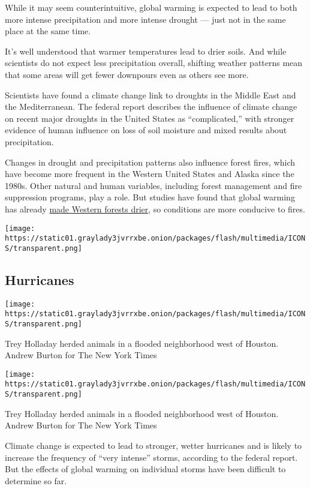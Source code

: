While it may seem counterintuitive, global warming is expected to lead
to both more intense precipitation and more intense drought --- just not
in the same place at the same time.

It's well understood that warmer temperatures lead to drier soils. And
while scientists do not expect less precipitation overall, shifting
weather patterns mean that some areas will get fewer downpours even as
others see more.

Scientists have found a climate change link to droughts in the Middle
East and the Mediterranean. The federal report describes the influence
of climate change on recent major droughts in the United States as
``complicated,'' with stronger evidence of human influence on loss of
soil moisture and mixed results about precipitation.

Changes in drought and precipitation patterns also influence forest
fires, which have become more frequent in the Western United States and
Alaska since the 1980s. Other natural and human variables, including
forest management and fire suppression programs, play a role. But
studies have found that global warming has already
\href{https://www.nytimes3xbfgragh.onion/2016/10/11/science/climate-change-forest-fires.html?mcubz=0}{made
Western forests drier}, so conditions are more conducive to fires.

\texttt{[image: https://static01.graylady3jvrrxbe.onion/packages/flash/multimedia/ICONS/transparent.png]}

\hypertarget{hurricanes}{%
\subsection{Hurricanes}\label{hurricanes}}

\texttt{[image: https://static01.graylady3jvrrxbe.onion/packages/flash/multimedia/ICONS/transparent.png]}

Trey Holladay herded animals in a flooded neighborhood west of Houston.
Andrew Burton for The New York Times

\texttt{[image: https://static01.graylady3jvrrxbe.onion/packages/flash/multimedia/ICONS/transparent.png]}

Trey Holladay herded animals in a flooded neighborhood west of Houston.
Andrew Burton for The New York Times

Climate change is expected to lead to stronger, wetter hurricanes and is
likely to increase the frequency of ``very intense'' storms, according
to the federal report. But the effects of global warming on individual
storms have been difficult to determine so far.

